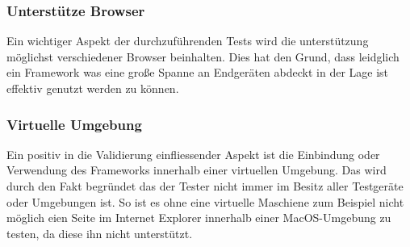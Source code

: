 	\subsubsection{Unterstütze Browser}
	Ein wichtiger Aspekt der durchzuführenden Tests wird die unterstützung möglichst verschiedener Browser beinhalten. Dies hat 	den Grund, dass leidglich ein Framework was eine große Spanne an Endgeräten abdeckt in der Lage ist effektiv genutzt werden 	zu können.

	\subsubsection{Virtuelle Umgebung}
	Ein positiv in die Validierung einfliessender Aspekt ist die Einbindung oder Verwendung des Frameworks innerhalb einer 			virtuellen Umgebung. Das wird durch den Fakt begründet das der Tester nicht immer im Besitz aller Testgeräte oder 				Umgebungen ist. So ist es ohne eine virtuelle Maschiene zum Beispiel nicht möglich eien Seite im Internet Explorer innerhalb 		einer MacOS-Umgebung zu testen, da diese ihn nicht unterstützt.

